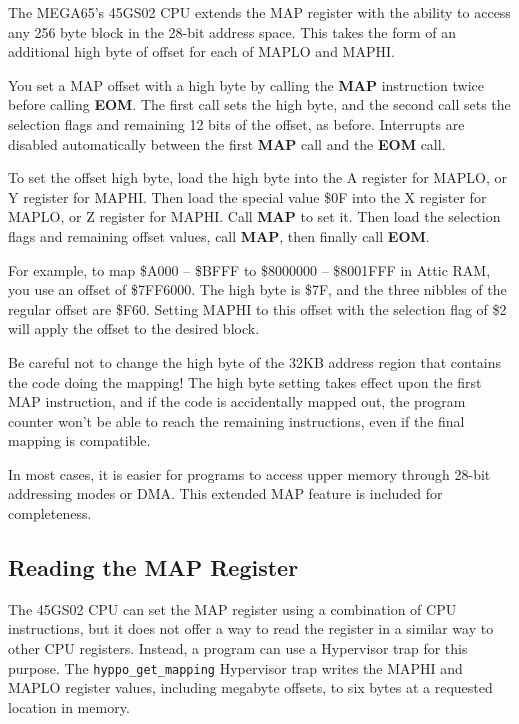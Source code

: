 The MEGA65's 45GS02 CPU extends the MAP register with the ability to access any 256 byte block in the 28-bit address space. This takes the form of an additional high byte of offset for each of MAPLO and MAPHI.

You set a MAP offset with a high byte by calling the {\bf MAP} instruction twice before calling {\bf EOM}. The first call sets the high byte, and the second call sets the selection flags and remaining 12 bits of the offset, as before. Interrupts are disabled automatically between the first {\bf MAP} call and the {\bf EOM} call.

To set the offset high byte, load the high byte into the A register for MAPLO, or Y register for MAPHI. Then load the special value \$0F into the X register for MAPLO, or Z register for MAPHI. Call {\bf MAP} to set it. Then load the selection flags and remaining offset values, call {\bf MAP}, then finally call {\bf EOM}.

For example, to map \$A000 -- \$BFFF to \$8000000 -- \$8001FFF in Attic RAM, you use an offset of \$7FF6000. The high byte is \$7F, and the three nibbles of the regular offset are \$F60. Setting MAPHI to this offset with the selection flag of \$2 will apply the offset to the desired block.


Be careful not to change the high byte of the 32KB address region that contains the code doing the mapping! The high byte setting takes effect upon the first MAP instruction, and if the code is accidentally mapped out, the program counter won't be able to reach the remaining instructions, even if the final mapping is compatible.

In most cases, it is easier for programs to access upper memory through 28-bit addressing modes or DMA. This extended MAP feature is included for completeness.

\subsection{Reading the MAP Register}

The 45GS02 CPU can set the MAP register using a combination of CPU instructions, but it does not offer a way to read the register in a similar way to other CPU registers. Instead, a program can use a Hypervisor trap for this purpose. The {\tt hyppo\_get\_mapping} Hypervisor trap writes the MAPHI and MAPLO register values, including megabyte offsets, to six bytes at a requested location in memory.

